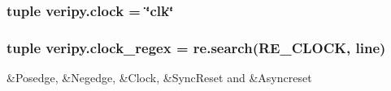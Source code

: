 \hypertarget{namespaceveripy_ae6605e6272b7db04b7d3ea58595fdd10}{
\subsubsection[{clock}]{\setlength{\rightskip}{0pt plus 5cm}tuple veripy.\-clock = \char`\"{}clk\char`\"{}}}\label{namespaceveripy_ae6605e6272b7db04b7d3ea58595fdd10}
\hypertarget{namespaceveripy_a296a71c1d954e9620e163178151f0a5f}{
\subsubsection[{clock\-\_\-regex}]{\setlength{\rightskip}{0pt plus 5cm}tuple veripy.\-clock\-\_\-regex = re.\-search(R\-E\-\_\-\-C\-L\-O\-C\-K, {\bf line})}}\label{namespaceveripy_a296a71c1d954e9620e163178151f0a5f}


\&Posedge, \&Negedge, \&Clock, \&Sync\-Reset and \&Asyncreset 

